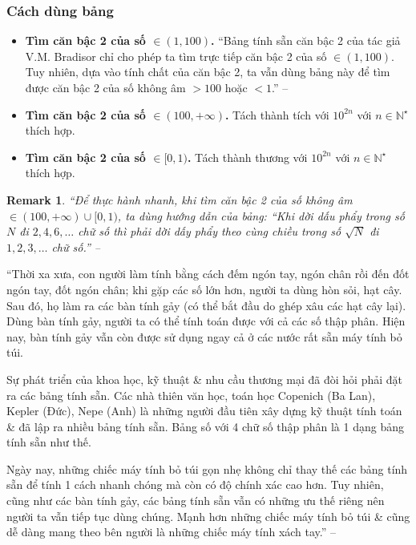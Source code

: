 \documentclass{article}
\numberwithin{equation}{section}
\newtheorem{remark}{Remark}[section]
\begin{document}
\subsubsection{Cách dùng bảng}

\begin{itemize}
	\item \textbf{Tìm căn bậc 2 của số $\in(1,100)$.} ``Bảng tính sẵn căn bậc 2 của tác giả V.M. Bradisor chỉ cho phép ta tìm trực tiếp căn bậc 2 của số $\in(1,100)$. Tuy nhiên, dựa vào tính chất của căn bậc 2, ta vẫn dùng bảng này để tìm được căn bậc 2 của số không âm $> 100$ hoặc $< 1$.'' -- \cite[p. 21]{SGK_Toan_9_tap_1}
	\item \textbf{Tìm căn bậc 2 của số $\in(100,+\infty)$.} Tách thành tích với $10^{2n}$ với $n\in\mathbb{N}^\star$ thích hợp.
	\item \textbf{Tìm căn bậc 2 của số $\in[0,1)$.} Tách thành thương với $10^{2n}$ với $n\in\mathbb{N}^\star$ thích hợp.
\end{itemize}

\begin{remark}
	``Để thực hành nhanh, khi tìm căn bậc 2 của số không âm $\in(100,+\infty)\cup[0,1)$, ta dùng hướng dẫn của bảng: ``Khi dời dấu phẩy trong số $N$ đi $2,4,6,\ldots$ chữ số thì phải dời dấy phẩy theo cùng chiều trong số $\sqrt{N}$ đi $1,2,3,\ldots$ chữ số.''  -- \cite[p. 22]{SGK_Toan_9_tap_1}
\end{remark}
``Thời xa xưa, con người làm tính bằng cách đếm ngón tay, ngón chân rồi đến đốt ngón tay, đốt ngón chân; khi gặp các số lớn hơn, người ta dùng hòn sỏi, hạt cây. Sau đó, họ làm ra các bàn tính gảy (có thể bắt đầu do ghép xâu các hạt cây lại). Dùng bàn tính gảy, người ta có thể tính toán được với cả các số thập phân. Hiện nay, bàn tính gảy vẫn còn được sử dụng ngay cả ở các nước rất sẵn máy tính bỏ túi.

Sự phát triển của khoa học, kỹ thuật \& nhu cầu thương mại đã đòi hỏi phải đặt ra các bảng tính sẵn. Các nhà thiên văn học, toán học Copenich (Ba Lan), Kepler (Đức), Nepe (Anh) là những người đầu tiên xây dựng kỹ thuật tính toán \& đã lập ra nhiều bảng tính sẵn. Bảng số với 4 chữ số thập phân là 1 dạng bảng tính sẵn như thế.

Ngày nay, những chiếc máy tính bỏ túi gọn nhẹ không chỉ thay thế các bảng tính sẵn để tính 1 cách nhanh chóng mà còn có độ chính xác cao hơn. Tuy nhiên, cũng như các bàn tính gảy, các bảng tính sẵn vẫn có những ưu thế riêng nên người ta vẫn tiếp tục dùng chúng. Mạnh hơn những chiếc máy tính bỏ túi \& cũng dễ dàng mang theo bên người là những chiếc máy tính xách tay.'' -- \cite[pp. 23--24]{SGK_Toan_9_tap_1}
\end{document}
